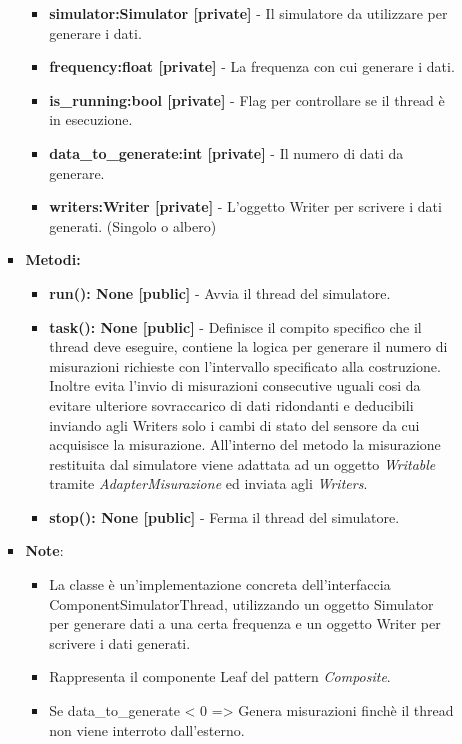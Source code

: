 \begin{itemize}
\begin{itemize}
\begin{itemize}
        \begin{itemize}
        \item \textbf{simulator:Simulator [private]} - Il simulatore da utilizzare per generare i dati.
        \item \textbf{frequency:float [private]} - La frequenza con cui generare i dati.
        \item \textbf{is\_running:bool [private]} - Flag per controllare se il thread è in esecuzione.
        \item \textbf{data\_to\_generate:int [private]} - Il numero di dati da generare.
        \item \textbf{writers:Writer [private]} - L'oggetto Writer per scrivere i dati generati. (Singolo o albero)
        \end{itemize}
    \item \textbf{Metodi: }
        \begin{itemize}
        \item \textbf{run(): None [public]} - Avvia il thread del simulatore.
        \item \textbf{task(): None [public]} - Definisce il compito specifico che il thread deve eseguire, contiene la logica per generare il numero di misurazioni richieste con l'intervallo specificato alla costruzione.
        Inoltre evita l'invio di misurazioni consecutive uguali cosi da evitare ulteriore sovraccarico di dati ridondanti e deducibili inviando agli Writers solo i cambi di stato del sensore da cui acquisisce la misurazione.
        All'interno del metodo la misurazione restituita dal simulatore viene adattata ad un oggetto \textit{Writable} tramite \textit{AdapterMisurazione} ed inviata agli \textit{Writers}.
        \item \textbf{stop(): None [public]} - Ferma il thread del simulatore.
        \end{itemize}
    \item\textbf{Note}:
        \begin{itemize}
            \item La classe è un'implementazione concreta dell'interfaccia ComponentSimulatorThread, utilizzando un oggetto Simulator per generare dati a una certa frequenza e un oggetto Writer per scrivere i dati generati.
            \item Rappresenta il componente Leaf del pattern \textit{Composite}.
            \item Se data\_to\_generate < 0 => Genera misurazioni finchè il thread non viene interroto dall'esterno.

\end{itemize}
\end{itemize}
\end{itemize}
\end{itemize}
